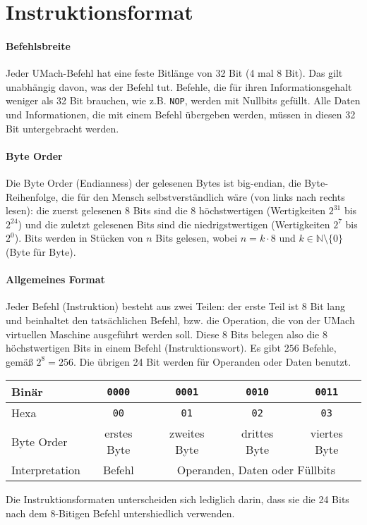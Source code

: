 \section{Instruktionsformat}

\paragraph{Befehlsbreite}
Jeder UMach-Befehl hat eine feste Bitlänge von 32 Bit (4 mal 8 Bit).
Das gilt unabhängig davon, was der Befehl tut. Befehle, die für ihren
Informationsgehalt weniger als 32 Bit brauchen, wie z.B. \texttt{NOP},
werden mit Nullbits gefüllt. Alle Daten und Informationen, die mit einem
Befehl übergeben werden, müssen in diesen 32 Bit untergebracht werden.

\paragraph{Byte Order}
Die Byte Order (Endianness) der gelesenen \glspl{Byte} ist
big-endian, die Byte-Reihenfolge, die für den Mensch selbstverständlich wäre
(von links nach rechts lesen):
die zuerst gelesenen 8 Bits sind die 8 höchstwertigen (Wertigkeiten $2^{31}$ bis
$2^{24}$) und die zuletzt gelesenen Bits sind die niedrigstwertigen
(Wertigkeiten $2^{7}$ bis $2^{0}$).
Bits werden in Stücken von $n$ Bits gelesen, wobei $n = k \cdot 8$ und
$k \in \mathbb{N} \setminus\{0\}$ (Byte für Byte).


\paragraph{Allgemeines Format}
Jeder Befehl (\gls{Instruktion}) besteht aus zwei Teilen: der erste Teil ist
8 Bit lang und beinhaltet den tatsächlichen \gls{Befehl}, bzw. die Operation,
die von der UMach virtuellen Maschine ausgeführt werden soll.
Diese 8 Bits belegen also die 8 höchstwertigen Bits in einem Befehl
(Instruktionswort).
Es gibt $256$ Befehle, gemäß $2^{8} = 256$.
Die übrigen 24 Bit werden für Operanden oder Daten benutzt.

\begin{center}
  \begin{tabular}{l|*{4}{c|}}
    Binär &
    \texttt{0000} & \texttt{0001} & \texttt{0010} & \texttt{0011} \\\hline
    Hexa  &
    \texttt{00}   & \texttt{01}   & \texttt{02}   & \texttt{03}   \\\hline
    Byte Order &
    erstes Byte   & zweites Byte  & drittes Byte  & viertes Byte  \\\hline
    Interpretation &
    Befehl    &  \multicolumn{3}{c|}{Operanden, Daten oder Füllbits} \\\hline
  \end{tabular}
\end{center}

Die Instruktionsformaten unterscheiden sich lediglich darin, dass sie die 24 Bits
nach dem 8-Bitigen \gls{Befehl} untershiedlich verwenden.

